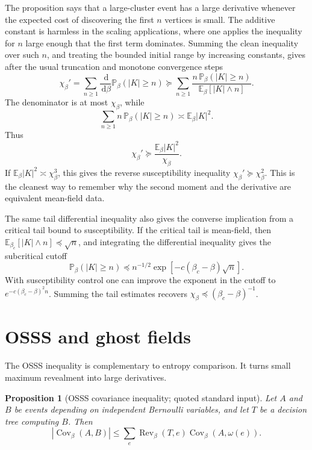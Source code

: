 \documentclass[11pt,reqno]{book}
\numberwithin{equation}{chapter}
\theoremstyle{plain}
\newtheorem{prop}[theorem]{Proposition}
\theoremstyle{definition}
\theoremstyle{remark}
\newcommand{\Eb}{\mathbb E_\beta}
\renewcommand{\P}{\mathbb P}
\newcommand{\E}{\mathbb E}
\newcommand{\1}{\mathbf 1}
\newcommand{\dd}{\,\mathrm d}
\newcommand{\pre}{\preceq}
\newcommand{\suc}{\succeq}
\begin{document}
The proposition says that a large-cluster event has a large derivative
whenever the expected cost of discovering the first \(n\) vertices is small.
The additive constant is harmless in the scaling applications, where one
applies the inequality for \(n\) large enough that the first term dominates.
Summing the clean inequality over such \(n\), and treating the bounded
initial range by increasing constants, gives after the usual truncation and
monotone convergence steps
\[
  \chi_\beta'
  =
  \sum_{n\geq1}
  \frac{\dd}{\dd\beta}\P_\beta(|K|\geq n)
  \suc
  \sum_{n\geq1}
  \frac{n\,\P_\beta(|K|\geq n)}
       {\Eb[|K|\wedge n]}.
\]
The denominator is at most \(\chi_\beta\), while
\[
  \sum_{n\geq1} n\,\P_\beta(|K|\geq n)
  \asymp
  \Eb |K|^2.
\]
Thus
\[
  \chi_\beta'\suc \frac{\Eb|K|^2}{\chi_\beta}.
\]
If \(\Eb|K|^2\asymp\chi_\beta^3\), this gives the reverse susceptibility inequality \(\chi_\beta'\suc\chi_\beta^2\). This is the cleanest way to remember why the second moment and the derivative are equivalent mean-field data.

The same tail differential inequality also gives the converse implication from a critical tail bound to susceptibility. If the critical tail is mean-field, then $\E_{\beta_c}[|K|\wedge n]\pre \sqrt n$, and integrating the differential inequality gives the subcritical cutoff
\[
  \P_\beta(|K|\geq n)
  \pre
  n^{-1/2}\exp[-c(\beta_c-\beta)\sqrt n].
\]
With susceptibility control one can improve the exponent in the cutoff to $e^{-c(\beta_c-\beta)^2n}$. Summing the tail estimates recovers $\chi_\beta\pre(\beta_c-\beta)^{-1}$.

\section{OSSS and ghost fields}

The OSSS inequality is complementary to entropy comparison. It turns small
maximum revealment into large derivatives.

\begin{prop}[OSSS covariance inequality; quoted standard input]
\label{prop:osss-covariance}
Let \(A\) and \(B\) be events depending on independent Bernoulli variables,
and let \(T\) be a decision tree computing \(B\). Then
\[
  |\operatorname{Cov}_\beta(A,B)|
  \leq
  \sum_e
  \operatorname{Rev}_\beta(T,e)
  \operatorname{Cov}_\beta(A,\omega(e)).
\]
\end{prop}
\end{document}
